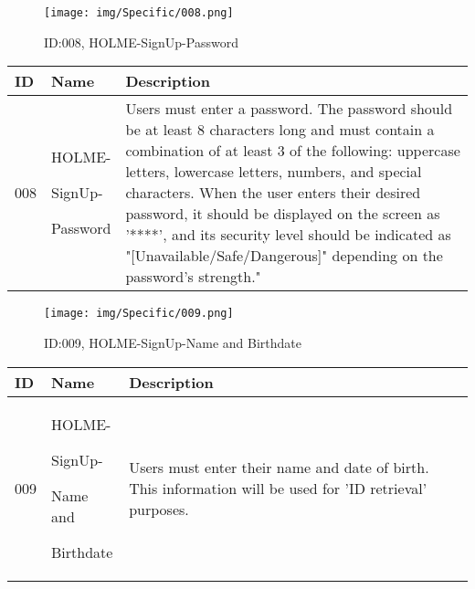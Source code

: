 \documentclass[conference]{IEEEtran}
\begin{document}
\begin{enumerate}
\begin{figure}[h]
\centering
\texttt{[image: img/Specific/008.png]}
\caption{ID:008, HOLME-SignUp-Password}
\end{figure}
\begin{table}[h]
\def\arraystretch{1.2} \small
    \begin{tabular}{|p{1cm}|p{1.8cm}|p{5.0cm}|}
        \hline
        ID & Name & Description\\ \hline
         008 \par  & HOLME-\par SignUp- \par Password &Users must enter a password. The password should be at least 8 characters long and must contain a combination of at least 3 of the following: uppercase letters, lowercase letters, numbers, and special characters. When the user enters their desired password, it should be displayed on the screen as '****', and its security level should be indicated as "[Unavailable/Safe/Dangerous]" depending on the password's strength."\\ \hline
	\end{tabular}
\end{table}

\clearpage

\begin{figure}[h]
\centering
\texttt{[image: img/Specific/009.png]}
\caption{ID:009, HOLME-SignUp-Name and Birthdate}
\end{figure}
\begin{table}[h]
\def\arraystretch{1.2} \small
    \begin{tabular}{|p{1cm}|p{1.8cm}|p{5.0cm}|}
        \hline
        ID & Name & Description\\ \hline
         009 \par  & HOLME-\par SignUp-\par Name and \par Birthdate &Users must enter their name and date of birth. This information will be used for 'ID retrieval' purposes.\\ \hline
	\end{tabular}
\end{table}


\end{enumerate}
\end{document}
